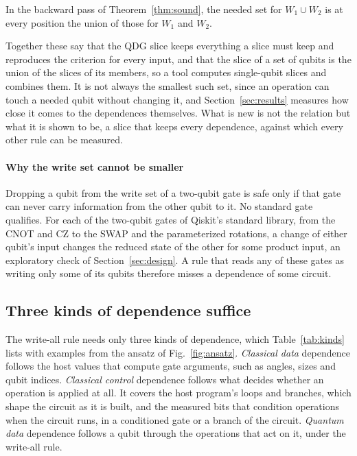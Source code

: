 \begin{IEEEproof}
In the backward pass of Theorem~\ref{thm:sound}, the needed set for $W_1 \cup W_2$ is at every position the union
of those for $W_1$ and $W_2$.
\end{IEEEproof}

Together these say that the QDG slice keeps everything a slice must keep and reproduces the criterion for every
input, and that the slice of a set of qubits is the union of the slices of its members, so a tool computes
single-qubit slices and combines them. It is not always the smallest such set, since an operation can touch a needed
qubit without changing it, and Section~\ref{sec:results} measures how close it comes to the dependences themselves.
What is new is not the relation but what it is shown to be, a slice that keeps every dependence, against which every
other rule can be measured.

\paragraph*{Why the write set cannot be smaller}
Dropping a qubit from the write set of a two-qubit gate is safe only if that gate can never carry information from
the other qubit to it. No standard gate qualifies. For each of the \numGateSignalN{} two-qubit gates of Qiskit's
standard library, from the CNOT and CZ to the SWAP and the parameterized rotations, a change of either qubit's input
changes the reduced state of the other for some product input, an exploratory check of Section~\ref{sec:design}. A rule that reads any
of these gates as writing only some of its qubits therefore misses a dependence of some circuit.

\subsection{Three kinds of dependence suffice}\label{sec:kinds}
The write-all rule needs only three kinds of dependence, which Table~\ref{tab:kinds} lists with examples from the
ansatz of Fig.~\ref{fig:ansatz}. \emph{Classical data} dependence follows the host values that compute gate
arguments, such as angles, sizes and qubit indices. \emph{Classical control} dependence follows what decides
whether an operation is applied at all. It covers the host program's loops and branches, which shape the circuit as it is built, and
the measured bits that condition operations when the circuit runs, in a conditioned gate or a branch of the circuit. \emph{Quantum data} dependence follows
a qubit through the operations that act on it, under the write-all rule.

